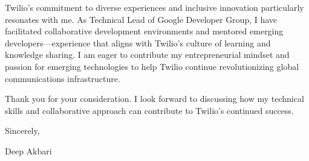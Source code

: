 \documentclass[11pt]{article}
\begin{document}
Twilio's commitment to diverse experiences and inclusive innovation particularly resonates with me. As Technical Lead of Google Developer Group, I have facilitated collaborative development environments and mentored emerging developers---experience that aligns with Twilio's culture of learning and knowledge sharing. I am eager to contribute my entrepreneurial mindset and passion for emerging technologies to help Twilio continue revolutionizing global communications infrastructure.

Thank you for your consideration. I look forward to discussing how my technical skills and collaborative approach can contribute to Twilio's continued success.

Sincerely,

Deep Akbari
\end{document}
